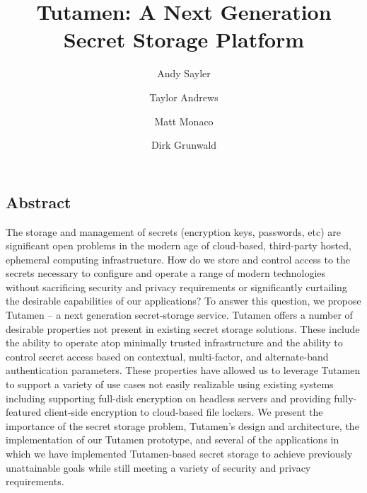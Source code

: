 \documentclass[letterpaper,twocolumn,10pt]{article}
\begin{document}
\date{}

\title{\Large \bf Tutamen: A Next Generation Secret Storage Platform}

\author{Andy Sayler}
\author{Taylor Andrews}
\author{Matt Monaco}
\author{Dirk Grunwald}

\maketitle


\subsection*{Abstract}

The storage and management of secrets (encryption keys, passwords,
etc) are significant open problems in the modern age of cloud-based,
third-party hosted, ephemeral computing infrastructure. How do we
store and control access to the secrets necessary to configure and
operate a range of modern technologies without sacrificing security
and privacy requirements or significantly curtailing the desirable
capabilities of our applications? To answer this question, we propose
Tutamen -- a next generation secret-storage service. Tutamen offers a
number of desirable properties not present in existing secret storage
solutions. These include the ability to operate atop minimally trusted
infrastructure and the ability to control secret access based on
contextual, multi-factor, and alternate-band authentication
parameters. These properties have allowed us to leverage Tutamen to
support a variety of use cases not easily realizable using existing
systems including supporting full-disk encryption on headless servers
and providing fully-featured client-side encryption to cloud-based
file lockers. We present the importance of the secret storage problem,
Tutamen's design and architecture, the implementation of our Tutamen
prototype, and several of the applications in which we have
implemented Tutamen-based secret storage to achieve previously
unattainable goals while still meeting a variety of security and
privacy requirements.








{
  \clearpage
  \footnotesize
  
  
}
\end{document}
